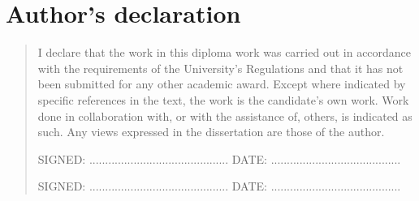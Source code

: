 %
%
\chapter{Author's declaration}
\begin{SingleSpace}
\begin{quote}
I declare that the work in this diploma work was carried out in accordance with the requirements of  the University's Regulations and that it  has not been submitted for any other academic award. Except where indicated by specific references in the text, the work is the candidate's own work. Work done in collaboration with, or with the assistance of, others, is indicated as such. Any views expressed in the dissertation are those of the author.

\vspace{1.5cm}
\noindent
\hspace{-0.75cm}\textsc{SIGNED: ............................................
DATE: .........................................}

\vspace{1.5cm}
\noindent
\hspace{-0.75cm}\textsc{SIGNED: ............................................
DATE: .........................................}
\end{quote}
\end{SingleSpace}

